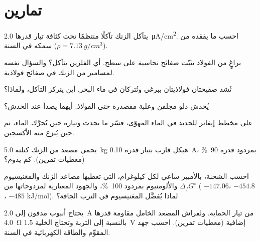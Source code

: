 \section{تمارين}

\begin{exercise}[$\star$]\label{exo:b2:corrosion:1}
يتآكل الزنك تآكلًا منتظمًا تحت كثافة تيار قدرها \qty{2.0}{\micro A/cm^2}.
احسب ما يفقده من سمكه في السنة ($\rho = \qty{7.13}{g/cm^3}$).
\end{exercise}

\begin{exercise}[$\star$]\label{exo:b2:corrosion:2}
براغٍ من الفولاذ تثبّت صفائح نحاسية على سطح. أي الفلزين يتآكل؟ والسؤال نفسه
لمسامير من الزنك في صفائح فولاذية.
\end{exercise}

\begin{exercise}[$\star$]\label{exo:b2:corrosion:3}
تُشد صفيحتان فولاذيتان ببرغي وتُتركان في ماء البحر. أين يتركز
التآكل، ولماذا؟
\end{exercise}

\begin{exercise}[$\star$]\label{exo:b2:corrosion:4}
يُخدش دلو مجلفن وعلبة مقصدرة حتى الفولاذ. أيهما
يصدأ عند الخدش؟
\end{exercise}

\begin{exercise}[$\star\star$]\label{exo:b2:corrosion:5}
على مخطط إيفانز للحديد في الماء المهوّى، فسّر ما يحدث 
وتياره حين يُحرَّك الماء، ثم حين
يُنزع منه الأكسجين.
\end{exercise}

\begin{exercise}[$\star\star$]\label{exo:b2:corrosion:6}
يحمي مصعد من الزنك كتلته \qty{5.0}{kg} هيكل قارب بتيار قدره
\qty{0.10}{A}، بمردود قدره 90~\% (معطيات تمرين). كم
يدوم؟
\end{exercise}

\begin{exercise}[$\star\star$]\label{exo:b2:corrosion:7}
احسب الشحنة، بالأمبير ساعي لكل كيلوغرام، التي تعطيها مصاعد الزنك والمغنيسيوم
والألومنيوم بمردود 100~\%، والجهود المعيارية لمزدوجاتها
من $\Delta_f G^\circ$ ( $-147.06$،  $-454.8$،
 $-485$ \unit{kJ/mol}). لماذا يُفضَّل المغنيسيوم في الترب الجافة؟
\end{exercise}

\begin{exercise}[$\star\star$]\label{exo:b2:corrosion:8}
يحتاج أنبوب مدفون إلى \qty{2.0}{A} من تيار الحماية. ولفراش المصعد
الخامل مقاومة قدرها \qty{4.0}{\ohm} بالنسبة إلى التربة وتحتاج الخلية
\qty{1.5}{V} إضافية (معطيات تمرين). احسب جهد المقوِّم 
والطاقة الكهربائية في السنة.
\end{exercise}

